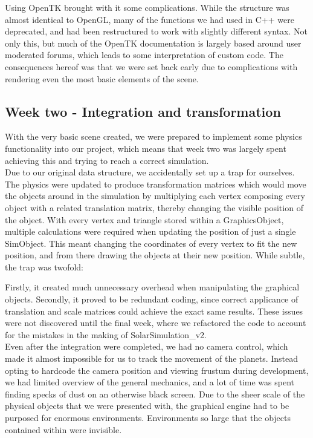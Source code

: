 Using OpenTK brought with it some complications. While the structure was almost identical to OpenGL, many of the functions we had used in C++ were deprecated, and had been restructured to work with slightly different syntax. Not only this, but much of the OpenTK documentation is largely based around user moderated forums, which leads to some interpretation of custom code. The consequences hereof was that we were set back early due to complications with rendering even the most basic elements of the scene.

\subsection{Week two - Integration and transformation}
With the very basic scene created, we were prepared to implement some physics functionality into our project, which means that week two was largely spent achieving this and trying to reach a correct simulation.\\

Due to our original data structure, we accidentally set up a trap for ourselves.
The physics were updated to produce transformation matrices which would move the objects around in the simulation by multiplying each vertex composing every object with a related translation matrix, thereby changing the visible position of the object.
With every vertex and triangle stored within a GraphicsObject, multiple calculations were required when updating the position of just a single SimObject. This meant changing the coordinates of every vertex to fit the new position, and from there drawing the objects at their new position. While subtle, the trap was twofold:

Firstly, it created much unnecessary overhead when manipulating the graphical objects. Secondly, it proved to be redundant coding, since correct applicance of translation and scale matrices could achieve the exact same results. These issues were not discovered until the final week, where we refactored the code to account for the mistakes in the making of SolarSimulation\_v2.\\

Even after the integration were completed, we had no camera control, which made it almost impossible for us to track the movement of the planets. Instead opting to hardcode the camera position and viewing frustum during development, we had limited overview of the general mechanics, and a lot of time was spent finding specks of dust on an otherwise black screen. Due to the sheer scale of the physical objects that we were presented with, the graphical engine had to be purposed for enormous environments. Environments so large that the objects contained within were invisible.\\

